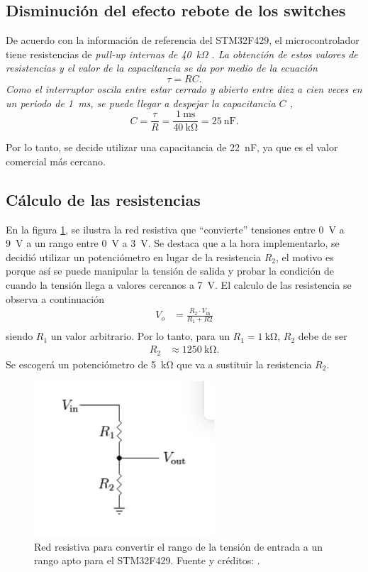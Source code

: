 \subsection{Disminución del efecto rebote de los switches}
De acuerdo con la información de referencia del STM32F429, el microcontrolador tiene resistencias de \it{pull-up} internas de \SI{40}{\kilo\ohm} \cite{stm32micro}.
La obtención de estos valores de resistencias y el valor de la capacitancia se da por medio de la ecuación
\begin{equation}
    \tau = RC.
\end{equation}
Como el interruptor oscila entre estar cerrado y abierto entre diez a cien veces en un periodo de \SI{1}{\milli\second}, se puede llegar a despejar la capacitancia $C$
\cite{boton},
\begin{equation*}
    C = \frac{\tau}{R} = \frac{\SI{1}{\milli\second}}{\SI{40}{\kilo\ohm}} = \SI{25}{\nano\farad}.
\end{equation*}

Por lo tanto, se decide utilizar una capacitancia de \SI{22}{\nano\farad}, ya que es el valor comercial más cercano.
 

 
\subsection{Cálculo de las resistencias}
En la figura \ref{Fig: cal_resist}, se ilustra la red resistiva que ``convierte'' tensiones entre \SI{0}{\volt} a \SI{9}{\volt} a un rango entre \SI{0}{\volt} a \SI{3}{\volt}. Se destaca que a la hora implementarlo, se decidió utilizar un potenciómetro en lugar de la resistencia \textit{$R_2$}, el motivo es porque así se puede manipular la tensión de salida y probar la condición de cuando la tensión llega a valores cercanos a \SI{7}{\volt}. El calculo de las resistencia se observa a continuación
\begin{align}
    V_o &= \frac{R_2 \cdot V_\text{in}}{R_1 + R2}\\
\end{align}
siendo $R_1$ un valor arbitrario. Por lo tanto, para un $R_1 = \SI{1}{\kilo\ohm}$, $R_2$ debe de ser
\begin{align*}
    R_2 &\approx \SI{1250}{\kilo\ohm}.
\end{align*}
Se escogerá un potenciómetro de \SI{5}{\kilo\ohm} que va a sustituir la resistencia $R_2$.

\begin{figure}[H]
\centering
\includegraphics[width=0.6\textwidth]{Imagenes/divisordetension.png} 
\caption{Red resistiva para convertir el rango de la tensión de entrada a un rango apto para el STM32F429. Fuente y créditos: \cite{divisor}.}
\label{Fig: cal_resist}
\end{figure}


